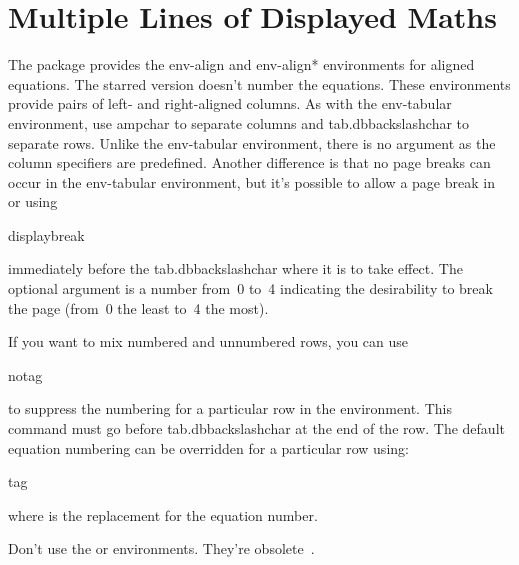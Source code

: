 \section{Multiple Lines of Displayed Maths}
\label{sec:align}

The  package provides the \gls{env-align}
and \gls{env-align*} environments for aligned equations.
The starred version doesn't number the equations. These environments 
provide pairs of left- and right-aligned columns.
As with the \gls{env-tabular} environment, use \gls{ampchar} to
separate columns and \gls{tab.dbbackslashchar} to separate rows.
Unlike the \gls{env-tabular} environment, there is no argument as
the column specifiers are predefined. Another difference is that no
page breaks can occur in the \gls{env-tabular} environment, but it's
possible to allow a page break in  or
 using
\begin{definition}
\gls{displaybreak}
\end{definition}
immediately before the \gls{tab.dbbackslashchar} where it is to take
effect. The optional argument is a number from~0 to~4 indicating the
desirability to break the page (from~0 the least to~4 the most).

If you want to mix numbered and unnumbered rows, you can use
\begin{definition}
\gls{notag}
\end{definition}
to suppress the numbering for a particular row in the  environment.
This command must go before \gls{tab.dbbackslashchar} at the end of the
row. The default equation numbering can be overridden for a
particular row using:
\begin{definition}
\gls{tag}
\end{definition}
where  is the replacement for the equation number.

\screenpagebreak\warning Don't use the  or 
environments. They're obsolete~\cite{l2tabu}.



